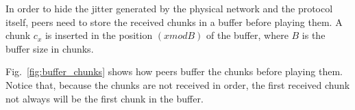 \label{sec:chunk_buffering}

In order to hide the jitter generated by the physical network and the
protocol itself, peers need to store the received chunks in a buffer
before playing them. A chunk $c_x$ is inserted in the position
$(x \mathit{mod} B)$ of the buffer, where $B$ is the buffer size in
chunks.

\begin{figure*}
   \caption{Buffering of the chunks.\label{fig:buffer_chunks}}
\end{figure*}

Fig.~\ref{fig:buffer_chunks} shows how peers buffer the chunks before
playing them. Notice that, because the chunks are not received in
order, the first received chunk not always will be the first chunk in
the buffer.
